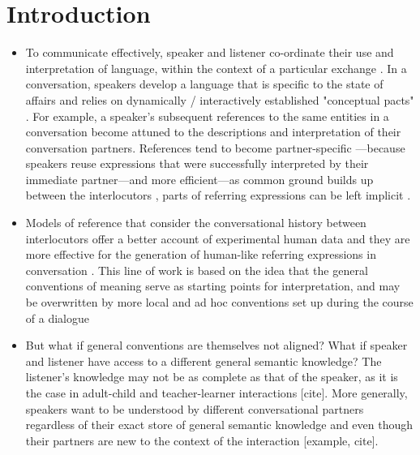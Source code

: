 
\section{Introduction}
\label{sec:intro}

\begin{itemize}
\item To communicate effectively, speaker and listener co-ordinate their use and interpretation of language, within the context of a particular exchange \cite{GarrodAnderson1987}.  In a conversation, speakers develop a language that is specific to the state of affairs and relies on dynamically / interactively established "conceptual pacts" \cite{GarrodAnderson1987,BrennanClark1996}. For example, a speaker's subsequent references \cite{mcdonald-1978-subsequent-reference} to the same entities in a conversation become attuned to the descriptions and interpretation of their conversation partners. References tend to become partner-specific \cite{BrennanClark1996,metzing2003conceptual,brennan2009partner}---because speakers reuse expressions that were successfully interpreted by their immediate partner---and more efficient---as common ground builds up between the interlocutors \cite{stalnaker2002common}, parts of referring expressions can be left implicit \cite{Grice75,ClarkWilkes-Gibbs1986,clark1991grounding,Clark1996}. 

\item Models of reference that consider the conversational history between interlocutors offer a better account of experimental human data \cite{BrennanClark1996,hawkins2020characterizing} and they are more effective for the generation of human-like referring expressions in conversation \cite{takmaz-etal-2020-refer,hawkins2020continual}. This line of work is based on the idea that the general conventions of meaning serve as starting points for interpretation, and may be overwritten by more local and ad hoc conventions set up during the course of a dialogue \cite{GarrodAnderson1987,ClarkWilkes-Gibbs1986}

\item But what if general conventions are themselves not aligned? What if speaker and listener have access to a different general semantic knowledge?  The listener's knowledge may not be as complete as that of the speaker, as it is the case in adult-child and teacher-learner interactions [cite]. More generally, speakers want to be understood by different conversational partners regardless of their exact store of general semantic knowledge and even though their partners are new to the context of the interaction [example, cite].


\end{itemize}

